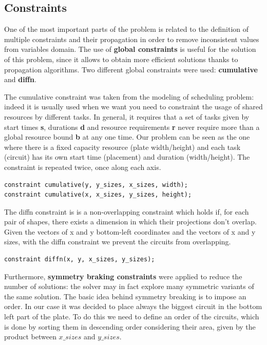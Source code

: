 \subsection{Constraints}

One of the most important parts of the problem is related to the definition of multiple constraints and their propagation in order to remove inconsistent values from variables domain.
The use of \textbf{global constraints} is useful for the solution of this problem, since it allows to obtain more efficient solutions thanks to propagation algorithms. Two different global constraints were used: \textbf {cumulative} and \textbf {diffn}. 

The cumulative constraint was taken from the modeling of scheduling problem: indeed it is usually used when we want you need to constraint the usage of shared resources by different tasks. In general, it requires that a set of tasks given by start times \textbf{s}, durations \textbf{d}  and resource requirements \textbf{r} never require more than a global resource bound \textbf{b} at any one time. 
Our problem can be seen as the one where there is a fixed capacity resource (plate width/height) and each task (circuit) has its own start time (placement) and duration (width/height). The constraint is repeated twice, once along each axis.

\begin{verbatim}
constraint cumulative(y, y_sizes, x_sizes, width); 
constraint cumulative(x, x_sizes, y_sizes, height);
\end{verbatim}

The diffn constraint is is a non-overlapping constraint which holds if, for each pair of shapes, there exists a dimension in which their projections don't overlap. Given the vectors of x and y bottom-left coordinates and the vectors of x and y sizes, with the diffn constraint we prevent the circuits from overlapping.

\begin{verbatim}
constraint diffn(x, y, x_sizes, y_sizes); 
\end{verbatim}


Furthermore, \textbf{symmetry braking constraints} were applied to reduce the number of solutions: the solver may in fact explore many symmetric variants of the same solution. The basic idea behind symmetry breaking is to impose an order.
In our case it was decided to place always the biggest circuit in the bottom left part
of the plate. To do this we need to define an order of the circuits, which is done by sorting them in descending order considering their area, given by the product between $x\_sizes$ and $y\_sizes$.

